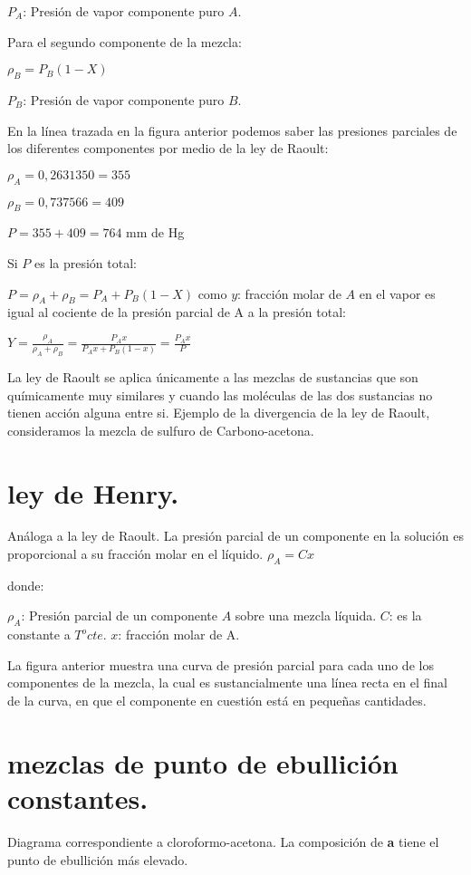 \documentclass[10pt,twocolumn,openany]{book}
\begin{document}
  $P_A$: Presión de vapor componente puro $A$.

  Para el segundo componente de la mezcla:

  $\rho_B=P_B (1-X)$

  $P_B$: Presión de vapor componente puro $B$.

En la línea trazada en la figura anterior podemos saber las presiones parciales de los diferentes
 componentes por medio de la ley de Raoult:

$\rho_A=0,263 1350 = 355$

$\rho_B= 0,737 566 = 409$

$P = 355 + 409 = 764$ mm de Hg

Si $P$ es la presión total:

$P=\rho_A + \rho_B = P_A + P_B (1-X)$ como 
$y$: fracción molar de $A$ en el vapor es igual al cociente de la presión parcial de A a la presión total:

$Y=\frac{\rho_A}{\rho_A+\rho_B}=\frac{P_A x}{P_A x+P_B (1-x)}=\frac{P_A x}{P}$

La ley de Raoult se aplica únicamente a las mezclas de sustancias que son químicamente muy similares 
y cuando las moléculas de las dos sustancias no tienen acción alguna entre si. Ejemplo de la 
divergencia de la ley de Raoult, consideramos la mezcla de sulfuro de Carbono-acetona.

\section{ley de Henry.}

Análoga a la ley de Raoult. La presión parcial de un componente en la solución es proporcional a su 
fracción molar en el líquido.
$\rho_A = C x$

donde:

$\rho_A$: Presión parcial de un componente $A$ sobre una mezcla líquida.
$C$: es la constante a $T^o cte.$
$x$: fracción molar de A.

La figura anterior muestra una curva de presión parcial para cada uno de los componentes de la 
mezcla, la cual es sustancialmente una línea recta en el final de la curva, en que el componente en 
cuestión está en pequeñas cantidades.

\section{mezclas de punto de ebullición constantes.}

Diagrama correspondiente a cloroformo-acetona. La composición de \textbf{a} tiene el punto de ebullición más elevado.
\end{document}
